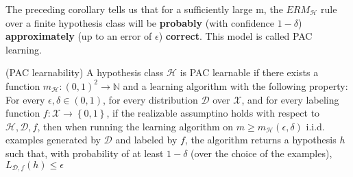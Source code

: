 The preceding corollary tells us that for a sufficiently large m, the $ERM_{\mathcal{H}}$ rule over a finite hypothesis class will be \textbf{probably} (with confidence $1-\delta$) \textbf{approximately} (up to an error of $\epsilon$) \textbf{correct}. This model is called PAC learning. 
\begin{definition}(PAC learnability)
    A hypothesis class $\mathcal{H}$ is PAC learnable if there exists a function $m_{\mathcal{H}}:(0,1)^2 \longrightarrow \mathbb{N}$ and a learning algorithm with the following property: For every $\epsilon, \delta \in (0,1)$, for every distribution $\mathcal{D}$ over $\mathcal{X}$, and for every labeling function $f: \mathcal{X}\longrightarrow\left\{ 0,1 \right\}$, if the realizable assumptino holds with respect to $\mathcal{H}, \mathcal{D}, f$, then when running the learning algorithm on $m \geq m_{\mathcal{H}}(\epsilon, \delta)$ i.i.d. examples generated by $\mathcal{D}$ and labeled by $f$, the algorithm returns a hypothesis $h$ such that, with probability of at least $1-\delta$ (over the choice of the examples), $L_{\mathcal{D},f}(h)\leq \epsilon$
\end{definition}